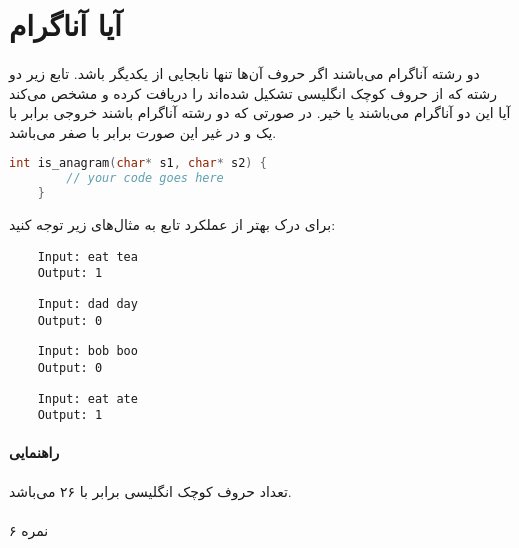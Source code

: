 \documentclass[../main.tex]{subfiles}
\begin{document}
\section{آیا آناگرام}
\paragraph{}
دو رشته آناگرام می‌باشند اگر حروف آن‌ها تنها نابجایی از یکدیگر باشد.
تابع زیر دو رشته که از حروف کوچک انگلیسی تشکیل شده‌اند را دریافت کرده و مشخص می‌کند
آیا این دو آناگرام می‌باشند یا خیر.
در صورتی که دو رشته آناگرام باشند خروجی برابر با یک و در غیر این صورت برابر با صفر می‌باشد.

\begin{latin}
\begin{lstlisting}[language=c]
    int is_anagram(char* s1, char* s2) {
        // your code goes here
    }
\end{lstlisting}
\end{latin}

برای درک بهتر از عملکرد تابع به مثال‌های زیر توجه کنید:

\begin{latin}
\begin{verbatim}
    Input: eat tea
    Output: 1
\end{verbatim}

\begin{verbatim}
    Input: dad day
    Output: 0
\end{verbatim}

\begin{verbatim}
    Input: bob boo
    Output: 0
\end{verbatim}

\begin{verbatim}
    Input: eat ate
    Output: 1
\end{verbatim}
\end{latin}

\paragraph{راهنمایی}
تعداد حروف کوچک انگلیسی برابر با ۲۶ می‌باشد.

\paragraph{}
۶ نمره
\end{document}
